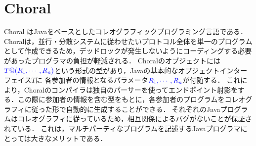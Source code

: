 \documentclass{thesis}
\begin{document}
\section{Choral}
Choral \cite{objective_Choreographies}はJavaをベースとしたコレオグラフィックプログラミング言語である．
Choralは，並行・分散システムに従わせたいプロトコル全体を単一のプログラムとして作成できるため，デッドロックが発生しないようにコーディングする必要があったプログラマの負担が軽減される．
Choralのオブジェクトには${\color{blue}{T@(R_1,\cdots,R_n)}}$という形式の型があり，Javaの基本的なオブジェクトインターフェイス$T$に
各参加者の情報となるパラメータ${\color{blue}{R_1,\cdots,R_n}}$が付随する．
これにより，Choralのコンパイラは独自のパーサーを使ってエンドポイント射影をする．この際に参加者の情報を含む型をもとに，各参加者のプログラムをコレオグラフィに従った形で自動的に生成することができる．
%
それぞれのJavaプログラムはコレオグラフィに従っているため，相互関係によるバグがないことが保証されている．
これは，マルチパーティなプログラムを記述するJavaプログラマにとっては大きなメリットである．
\end{document}
